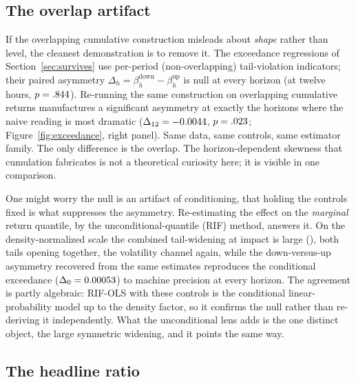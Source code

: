 \subsection{The overlap artifact}
\label{sec:overlap}

If the overlapping cumulative construction misleads about \emph{shape}
rather than level, the cleanest demonstration is to remove it. The
exceedance regressions of Section~\ref{sec:survives} use per-period (non-overlapping)
tail-violation indicators; their paired asymmetry $\Delta_h =
\beta^{\text{down}}_h - \beta^{\text{up}}_h$ is null at every horizon
(at twelve hours, $p = .844$). Re-running the same
construction on overlapping cumulative returns manufactures a significant
asymmetry at exactly the horizons where the naive reading is most
dramatic ($\Delta_{12} = -0.0044$, $p = .023$;
Figure~\ref{fig:exceedance}, right panel). Same data, same controls, same
estimator family. The only difference is the overlap. The
horizon-dependent skewness that cumulation fabricates
\citep{neuberger2021,farago2023} is not a theoretical curiosity here; it is
visible in one comparison.

One might worry the null is an artifact of conditioning, that holding the
controls fixed is what suppresses the asymmetry. Re-estimating the effect on
the \emph{marginal} return quantile, by the unconditional-quantile (RIF)
method, answers it. On the density-normalized scale the combined
tail-widening at impact is large (\RifVolWideningImpact), both tails opening
together, the volatility channel again, while the down-versus-up asymmetry
recovered from the same estimates reproduces the conditional exceedance
($\Delta_0 = 0.00053$) to machine precision at every horizon. The
agreement is partly algebraic: RIF-OLS with these
controls is the conditional linear-probability model up to the density
factor, so it confirms the null rather than re-deriving it independently.
What the unconditional lens adds is the one distinct object,
the large symmetric widening, and it points the same way.

\subsection{The headline ratio}

